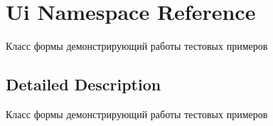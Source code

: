 \hypertarget{namespace_ui}{}\section{Ui Namespace Reference}
\label{namespace_ui}


Класс формы демонстрирующий работы тестовых примеров  




\subsection{Detailed Description}
Класс формы демонстрирующий работы тестовых примеров 